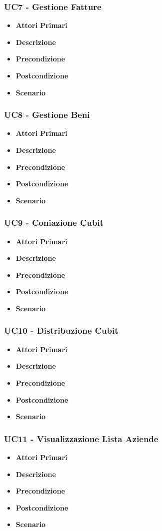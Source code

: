 \subsubsection{UC7 - Gestione Fatture}
\begin{itemize}
	\item \textbf{Attori Primari}
	\item \textbf{Descrizione}
	\item \textbf{Precondizione}
	\item \textbf{Postcondizione}
	\item \textbf{Scenario}
\end{itemize}
\subsubsection{UC8 - Gestione Beni}
\begin{itemize}
	\item \textbf{Attori Primari}
	\item \textbf{Descrizione}
	\item \textbf{Precondizione}
	\item \textbf{Postcondizione}
	\item \textbf{Scenario}
\end{itemize}
\subsubsection{UC9 -  Coniazione Cubit}
\begin{itemize}
	\item \textbf{Attori Primari}
	\item \textbf{Descrizione}
	\item \textbf{Precondizione}
	\item \textbf{Postcondizione}
	\item \textbf{Scenario}
\end{itemize}
\subsubsection{UC10 - Distribuzione Cubit}
\begin{itemize}
	\item \textbf{Attori Primari}
	\item \textbf{Descrizione}
	\item \textbf{Precondizione}
	\item \textbf{Postcondizione}
	\item \textbf{Scenario}
\end{itemize}
\subsubsection{UC11 - Visualizzazione Lista Aziende}
\begin{itemize}
	\item \textbf{Attori Primari}
	\item \textbf{Descrizione}
	\item \textbf{Precondizione}
	\item \textbf{Postcondizione}
	\item \textbf{Scenario}
\end{itemize}